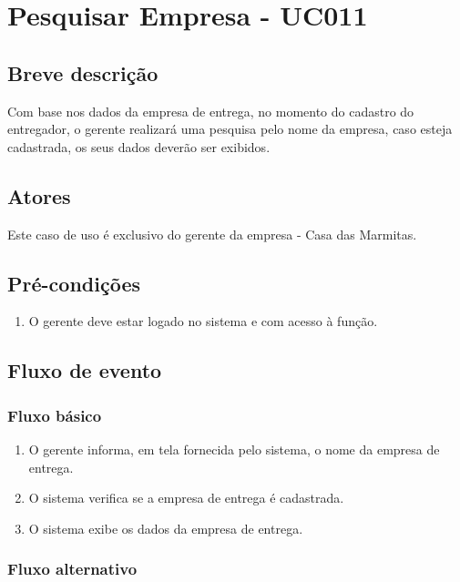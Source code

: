 \chapter{Pesquisar Empresa - UC011} \label{uc011}

\section{Breve descrição}

Com base nos dados da empresa de entrega, no momento do cadastro do entregador, o gerente realizará uma pesquisa pelo nome da empresa, caso esteja cadastrada, os seus dados deverão ser exibidos.

\section{Atores}

Este caso de uso é exclusivo do gerente da empresa - Casa das Marmitas.

\section{Pré-condições}

\begin{enumerate}
	\item O gerente deve estar logado no sistema e com acesso à função.
\end{enumerate}

\section{Fluxo de evento}

\subsection{Fluxo básico}

\begin{enumerate}
	\item O gerente informa, em tela fornecida pelo sistema, o nome da empresa de entrega.	
	\item O sistema verifica se a empresa de entrega é cadastrada.
	\item O sistema exibe os dados da empresa de entrega.
\end{enumerate}

\subsection{Fluxo alternativo}

